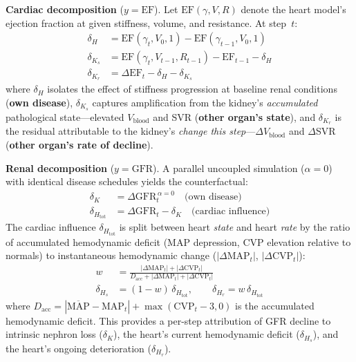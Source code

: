 \documentclass[10pt,twocolumn]{article}
\begin{document}
\textbf{Cardiac decomposition} ($y = \text{EF}$). Let $\text{EF}(\gamma, V, R)$ denote the heart model's ejection fraction at given stiffness, volume, and resistance. At step~$t$:
\begin{align}
\delta_H &= \text{EF}(\gamma_t, V_0, 1) - \text{EF}(\gamma_{t\!-\!1}, V_0, 1) \label{eq:dh}\\
\delta_{K_s} &= \text{EF}(\gamma_t, V_{t\!-\!1}, R_{t\!-\!1}) - \text{EF}_{t\!-\!1} - \delta_H \label{eq:dks}\\
\delta_{K_r} &= \Delta\text{EF}_t - \delta_H - \delta_{K_s} \label{eq:dkr}
\end{align}
where $\delta_H$ isolates the effect of stiffness progression at baseline renal conditions (\textbf{own disease}), $\delta_{K_s}$ captures amplification from the kidney's \emph{accumulated} pathological state---elevated $V_{\text{blood}}$ and SVR (\textbf{other organ's state}), and $\delta_{K_r}$ is the residual attributable to the kidney's \emph{change this step}---$\Delta V_{\text{blood}}$ and $\Delta$SVR (\textbf{other organ's rate of decline}).

\textbf{Renal decomposition} ($y = \text{GFR}$). A parallel uncoupled simulation ($\alpha = 0$) with identical disease schedules yields the counterfactual:
\begin{align}
\delta_K &= \Delta\text{GFR}_t^{\,\alpha=0} \quad \text{(own disease)} \label{eq:dk}\\
\delta_{H_{\text{tot}}} &= \Delta\text{GFR}_t - \delta_K \quad \text{(cardiac influence)} \label{eq:dhtot}
\end{align}
The cardiac influence $\delta_{H_{\text{tot}}}$ is split between heart \emph{state} and heart \emph{rate} by the ratio of accumulated hemodynamic deficit (MAP depression, CVP elevation relative to normals) to instantaneous hemodynamic change ($|\Delta\text{MAP}_t|$, $|\Delta\text{CVP}_t|$):
\begin{align}
w &= \frac{|\Delta\text{MAP}_t| + |\Delta\text{CVP}_t|}{D_{\text{acc}} + |\Delta\text{MAP}_t| + |\Delta\text{CVP}_t|} \nonumber\\[3pt]
\delta_{H_s} &= (1\!-\!w)\,\delta_{H_{\text{tot}}}, \qquad \delta_{H_r} = w\,\delta_{H_{\text{tot}}} \label{eq:dhsplit}
\end{align}
where $D_{\text{acc}} = |\overline{\text{MAP}} - \text{MAP}_t| + \max(\text{CVP}_t - 3, 0)$ is the accumulated hemodynamic deficit. This provides a per-step attribution of GFR decline to intrinsic nephron loss ($\delta_K$), the heart's current hemodynamic deficit ($\delta_{H_s}$), and the heart's ongoing deterioration ($\delta_{H_r}$).
\end{document}
